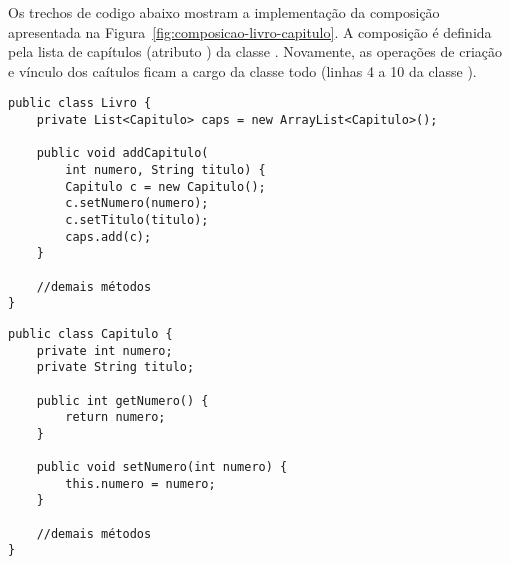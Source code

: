 Os trechos de codigo abaixo mostram a implementação da composição apresentada na Figura~\ref{fig:composicao-livro-capitulo}. A composição é definida pela lista de capítulos (atributo ) da classe . Novamente, as operações de criação e vínculo dos caítulos ficam a cargo da classe todo (linhas 4 a 10 da classe ).
 
\begin{verbatim}
public class Livro {
	private List<Capitulo> caps = new ArrayList<Capitulo>();

	public void addCapitulo(
		int numero, String titulo) {
		Capitulo c = new Capitulo();
		c.setNumero(numero);
		c.setTitulo(titulo);
		caps.add(c);
	}
	
	//demais métodos
}
\end{verbatim}
 
\begin{verbatim}
public class Capitulo {
	private int numero;
	private String titulo;

	public int getNumero() {
		return numero;
	}
	
	public void setNumero(int numero) {
		this.numero = numero;
	}
	
	//demais métodos
}
\end{verbatim}